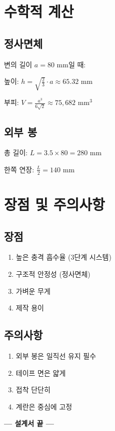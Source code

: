 \documentclass[a4paper,12pt]{article}
\begin{document}
\begin{CJK}{UTF8}{mj}
\section{수학적 계산}

\subsection{정사면체}
변의 길이 $a = 80$ mm일 때:

높이: $h = \sqrt{\frac{2}{3}} \cdot a \approx 65.32$ mm

부피: $V = \frac{a^3}{6\sqrt{2}} \approx 75,682$ mm$^3$

\subsection{외부 봉}
총 길이: $L = 3.5 \times 80 = 280$ mm

한쪽 연장: $\frac{L}{2} = 140$ mm

\section{장점 및 주의사항}

\subsection{장점}
\begin{enumerate}
    \item 높은 충격 흡수율 (3단계 시스템)
    \item 구조적 안정성 (정사면체)
    \item 가벼운 무게
    \item 제작 용이
\end{enumerate}

\subsection{주의사항}
\begin{enumerate}
    \item 외부 봉은 일직선 유지 필수
    \item 테이프 면은 얇게
    \item 접착 단단히
    \item 계란은 중심에 고정
\end{enumerate}

\vspace{1cm}
\begin{center}
\large\textbf{--- 설계서 끝 ---}
\end{center}

\end{CJK}
\end{document}

